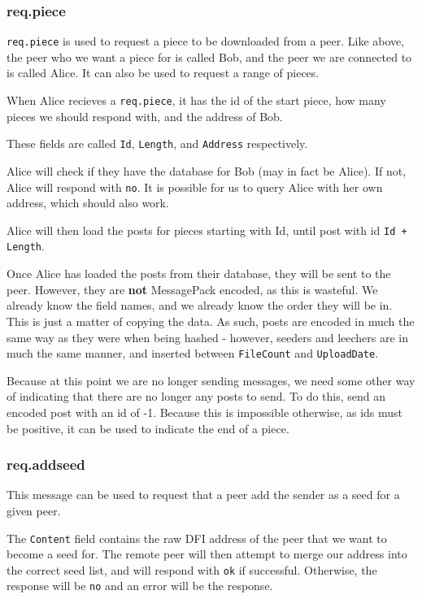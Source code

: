 	\subsubsection{req.piece}
	\begin{multicols}{2}
		\texttt{req.piece} is used to request a piece to be downloaded from a
		peer. Like above, the peer who we want a piece for is called Bob, and
		the peer we are connected to is called Alice. It can also be used to
		request a range of pieces.

		When Alice recieves a \texttt{req.piece}, it has the id of the start
		piece, how many pieces we should respond with, and the address of Bob.

		These fields are called \texttt{Id}, \texttt{Length}, and
		\texttt{Address} respectively.

		Alice will check if they have the database for Bob (may in fact
		be Alice). If not, Alice will respond with \texttt{no}. It is possible
		for us to query Alice with her own address, which should also work.

		Alice will then load the posts for pieces starting with Id, until post
		with id \texttt{Id + Length}.

		Once Alice has loaded the posts from their database, they will be sent
		to the peer. However, they are \textbf{not} MessagePack encoded, as this
		is wasteful. We already know the field names, and we already know the
		order they will be in. This is just a matter of copying the data. As
		such, posts are encoded in much the same way as they were when being
		hashed - however, seeders and leechers are in much the same manner, and
		inserted between \texttt{FileCount} and \texttt{UploadDate}.

		Because at this point we are no longer sending messages, we need some
		other way of indicating that there are no longer any posts to send. To
		do this, send an encoded post with an id of -1. Because this is impossible
		otherwise, as ids must be positive, it can be used to indicate the end of a
		piece.
	\end{multicols}

	\newpage
	\subsubsection{req.addseed}
	\begin{multicols}{2}
		This message can be used to request that a peer add the sender as a seed for a
		given peer.

		The \texttt{Content} field contains the raw DFI address of the peer that we want
		to become a seed for. The remote peer will then attempt to merge our
		address into the correct seed list, and will respond with \texttt{ok} if
		successful. Otherwise, the response will be \texttt{no} and an error
		will be the response.
	\end{multicols}

